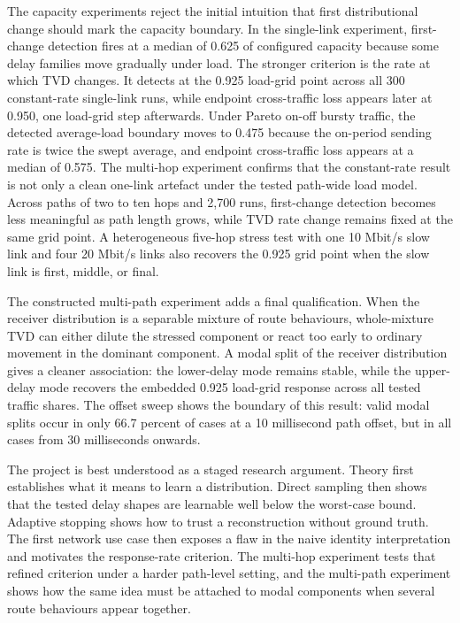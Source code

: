 \documentclass[a4paper,11pt]{report}
\begin{document}
The capacity experiments reject the initial intuition that first distributional change should mark the capacity boundary. In the single-link experiment, first-change detection fires at a median of 0.625 of configured capacity because some delay families move gradually under load. The stronger criterion is the rate at which TVD changes. It detects at the 0.925 load-grid point across all 300 constant-rate single-link runs, while endpoint cross-traffic loss appears later at 0.950, one load-grid step afterwards. Under Pareto on-off bursty traffic, the detected average-load boundary moves to 0.475 because the on-period sending rate is twice the swept average, and endpoint cross-traffic loss appears at a median of 0.575. The multi-hop experiment confirms that the constant-rate result is not only a clean one-link artefact under the tested path-wide load model. Across paths of two to ten hops and 2,700 runs, first-change detection becomes less meaningful as path length grows, while TVD rate change remains fixed at the same grid point. A heterogeneous five-hop stress test with one 10 Mbit/s slow link and four 20 Mbit/s links also recovers the 0.925 grid point when the slow link is first, middle, or final.

The constructed multi-path experiment adds a final qualification. When the receiver distribution is a separable mixture of route behaviours, whole-mixture TVD can either dilute the stressed component or react too early to ordinary movement in the dominant component. A modal split of the receiver distribution gives a cleaner association: the lower-delay mode remains stable, while the upper-delay mode recovers the embedded 0.925 load-grid response across all tested traffic shares. The offset sweep shows the boundary of this result: valid modal splits occur in only 66.7 percent of cases at a 10 millisecond path offset, but in all cases from 30 milliseconds onwards.

The project is best understood as a staged research argument. Theory first establishes what it means to learn a distribution. Direct sampling then shows that the tested delay shapes are learnable well below the worst-case bound. Adaptive stopping shows how to trust a reconstruction without ground truth. The first network use case then exposes a flaw in the naive identity interpretation and motivates the response-rate criterion. The multi-hop experiment tests that refined criterion under a harder path-level setting, and the multi-path experiment shows how the same idea must be attached to modal components when several route behaviours appear together.
\end{document}
